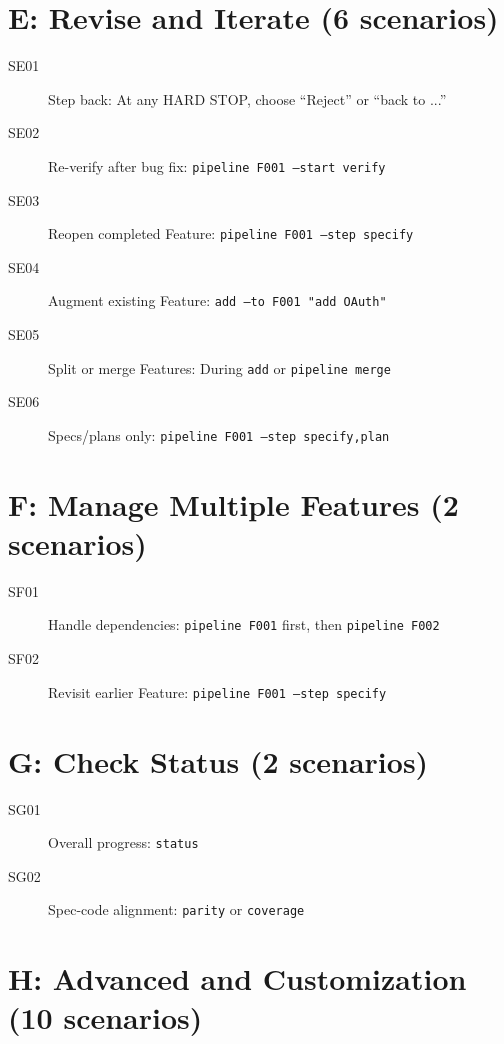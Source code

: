 \documentclass[11pt,a4paper,openright,twoside]{report}
\begin{document}
\section{E: Revise and Iterate (6 scenarios)}

\begin{description}
  \item[SE01] Step back: At any HARD STOP, choose ``Reject'' or ``back to ...''
  \item[SE02] Re-verify after bug fix: \texttt{pipeline F001 --start verify}
  \item[SE03] Reopen completed Feature: \texttt{pipeline F001 --step specify}
  \item[SE04] Augment existing Feature: \texttt{add --to F001 "add OAuth"}
  \item[SE05] Split or merge Features: During \texttt{add} or \texttt{pipeline merge}
  \item[SE06] Specs/plans only: \texttt{pipeline F001 --step specify,plan}
\end{description}

\section{F: Manage Multiple Features (2 scenarios)}

\begin{description}
  \item[SF01] Handle dependencies: \texttt{pipeline F001} first, then \texttt{pipeline F002}
  \item[SF02] Revisit earlier Feature: \texttt{pipeline F001 --step specify}
\end{description}

\section{G: Check Status (2 scenarios)}

\begin{description}
  \item[SG01] Overall progress: \texttt{status}
  \item[SG02] Spec-code alignment: \texttt{parity} or \texttt{coverage}
\end{description}

\section{H: Advanced and Customization (10 scenarios)}
\end{document}
